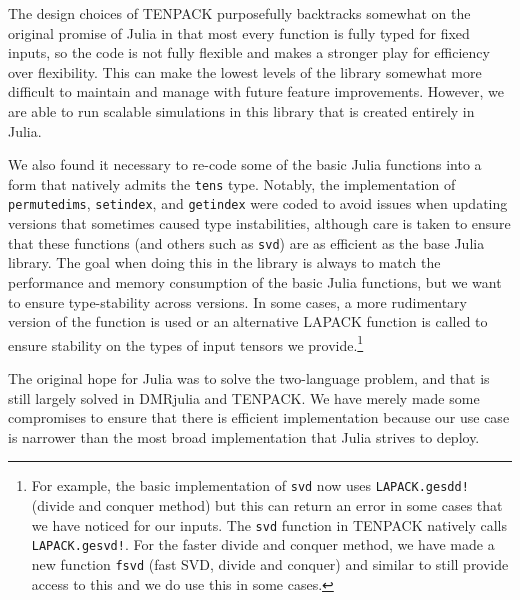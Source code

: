 \documentclass{juliacon}
\begin{document}
The design choices of TENPACK purposefully backtracks somewhat on the original promise of Julia in that most every function is fully typed for fixed inputs, so the code is not fully flexible and makes a stronger play for efficiency over flexibility. This can make the lowest levels of the library somewhat more difficult to maintain and manage with future feature improvements. However, we are able to run scalable simulations in this library that is created entirely in Julia.

We also found it necessary to re-code some of the basic Julia functions into a form that natively admits the {\tt tens} type. Notably, the implementation of {\tt permutedims}, {\tt setindex}, and {\tt getindex} were coded to avoid issues when updating versions that sometimes caused type instabilities, although care is taken to ensure that these functions (and others such as {\tt svd}) are as efficient as the base Julia library. %
The goal when doing this in the library is always to match the performance and memory consumption of the basic Julia functions, but we want to ensure type-stability across versions. In some cases, a more rudimentary version of the function is used \cite{press1992numerical} or an alternative LAPACK function is called to ensure stability on the types of input tensors we provide.\footnote{For example, the basic implementation of {\tt svd} now uses {\tt LAPACK.gesdd!} (divide and conquer method) but this can return an error in some cases that we have noticed for our inputs. The {\tt svd} function in TENPACK natively calls {\tt LAPACK.gesvd!}. For the faster divide and conquer method, we have made a new function {\tt fsvd} (fast SVD, divide and conquer) and similar to still provide access to this and we do use this in some cases.}



The original hope for Julia was to solve the two-language problem, and that is still largely solved in DMRjulia and TENPACK. We have merely made some compromises to ensure that there is efficient implementation because our use case is narrower than the most broad implementation that Julia strives to deploy.
\end{document}

